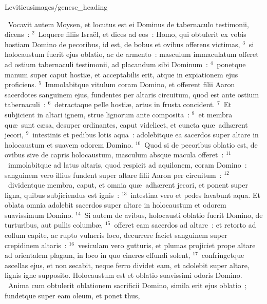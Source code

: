 {Leviticus}{images/genese_heading}

~\lettrine[lines=10,image=true,loversize=0.05,lraise=-0.03]{V}{}ocavit autem Moysen, et locutus est ei Dominus de tabernaculo testimonii, dicens~:
${}^{2}$~Loquere filiis Isra\"el, et dices ad eos~: Homo, qui obtulerit ex vobis hostiam Domino de pecoribus, id est, de bobus et ovibus offerens victimas,
${}^{3}$~si holocaustum fuerit ejus oblatio, ac de armento~: masculum immaculatum offeret ad ostium tabernaculi testimonii, ad placandum sibi Dominum~:
${}^{4}$~ponetque manum super caput hosti\ae , et acceptabilis erit, atque in expiationem ejus proficiens.
${}^{5}$~Immolabitque vitulum coram Domino, et offerent filii Aaron sacerdotes sanguinem ejus, fundentes per altaris circuitum, quod est ante ostium tabernaculi~:
${}^{6}$~detractaque pelle hosti\ae , artus in frusta concident.
${}^{7}$~Et subjicient in altari ignem, strue lignorum ante composita~:
${}^{8}$~et membra qu\ae\ sunt c\ae sa, desuper ordinantes, caput videlicet, et cuncta qu\ae\ adh\ae rent jecori,
${}^{9}$~intestinis et pedibus lotis aqua~: adolebitque ea sacerdos super altare in holocaustum et suavem odorem Domino.
${}^{10}$~Quod si de pecoribus oblatio est, de ovibus sive de capris holocaustum, masculum absque macula offeret~:
${}^{11}$~immolabitque ad latus altaris, quod respicit ad aquilonem, coram Domino~: sanguinem vero illius fundent super altare filii Aaron per circuitum~:
${}^{12}$~dividentque membra, caput, et omnia qu\ae\ adh\ae rent jecori, et ponent super ligna, quibus subjiciendus est ignis~:
${}^{13}$~intestina vero et pedes lavabunt aqua. Et oblata omnia adolebit sacerdos super altare in holocaustum et odorem suavissimum Domino.
${}^{14}$~Si autem de avibus, holocausti oblatio fuerit Domino, de turturibus, aut pullis columb\ae ,
${}^{15}$~offeret eam sacerdos ad altare~: et retorto ad collum capite, ac rupto vulneris loco, decurrere faciet sanguinem super crepidinem altaris~:
${}^{16}$~vesiculam vero gutturis, et plumas projiciet prope altare ad orientalem plagam, in loco in quo cineres effundi solent,
${}^{17}$~confringetque ascellas ejus, et non secabit, neque ferro dividet eam, et adolebit super altare, lignis igne supposito. Holocaustum est et oblatio suavissimi odoris Domino.
~\lettrine[lines=10,image=true,loversize=0.05,lraise=-0.03]{A}{}nima cum obtulerit oblationem sacrificii Domino, simila erit ejus oblatio~; fundetque super eam oleum, et ponet thus,
